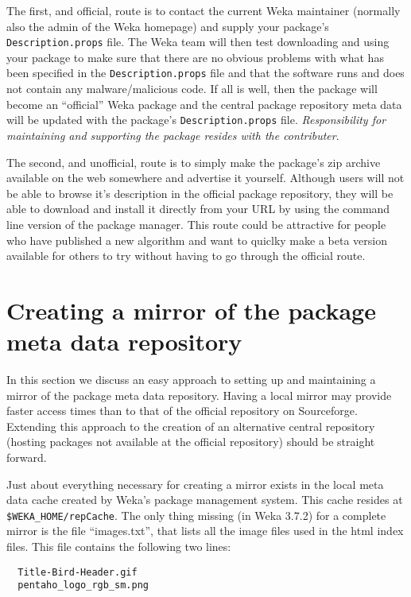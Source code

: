 The first, and official, route is to contact the current Weka
maintainer (normally also the admin of the Weka homepage) and supply
your package's \texttt{Description.props} file. The Weka team will
then test downloading and using your package to make sure that there
are no obvious problems with what has been specified in the
\texttt{Description.props} file and that the software runs and does
not contain any malware/malicious code. If all is well, then the
package will become an ``official'' Weka package and the central
package repository meta data will be updated with the package's
\texttt{Description.props} file. \textit{Responsibility for
  maintaining and supporting the package resides with the
  contributer}.

The second, and unofficial, route is to simply make the package's zip
archive available on the web somewhere and advertise it
yourself. Although users will not be able to browse it's description
in the official package repository, they will be able to download and
install it directly from your URL by using the command line version of
the package manager. This route could be attractive for people who
have published a new algorithm and want to quiclky make a beta version
available for others to try without having to go through the official
route.

\section{Creating a mirror of the package meta data repository}

In this section we discuss an easy approach to setting up and
maintaining a mirror of the package meta data repository. Having a
local mirror may provide faster access times than to that of the
official repository on Sourceforge. Extending this approach to the
creation of an alternative central repository (hosting packages not
available at the official repository) should be straight forward.

Just about everything necessary for creating a mirror exists in
the local meta data cache created by Weka's package management
system. This cache resides at \verb=$WEKA_HOME/repCache=. The only
thing missing (in Weka 3.7.2) for a complete mirror is the
file ``images.txt'', that lists all the image files used in the html
index files. This file contains the following two lines:

\begin{verbatim}
  Title-Bird-Header.gif
  pentaho_logo_rgb_sm.png
\end{verbatim}

